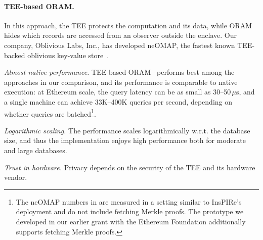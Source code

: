 \paragraph{TEE-based ORAM.}
In this approach, the TEE protects the computation and its data, while ORAM
hides which records are accessed from an observer outside the enclave. Our
company, Oblivious Labs, Inc., has developed neOMAP, 
the fastest known TEE-backed oblivious
key-value store~\cite{neomap}.
\begin{pros}
\item \emph{Almost native performance.} TEE-based ORAM~\cite{neomap} performs best among the
  approaches in our comparison, and its performance is comparable to native
  execution: at Ethereum scale, the query latency can be as small as
  30--50\,$\mu$s, and a single machine can achieve 33K--400K queries per
  second, depending on whether queries are batched\footnote{The neOMAP numbers in
   are measured in a setting similar to InsPIRe's
  deployment and do not include fetching Merkle proofs.
The prototype we developed in our earlier grant
  with the Ethereum Foundation additionally supports fetching Merkle proofs.}.
\item \emph{Logarithmic scaling.} 
The performance scales logarithmically w.r.t. 
the database size, and thus the implementation enjoys high performance
both for moderate and large databases. 
\end{pros}
\begin{cons}
\item \emph{Trust in hardware.} Privacy depends on the security of the TEE
  and its hardware vendor.
\end{cons}

